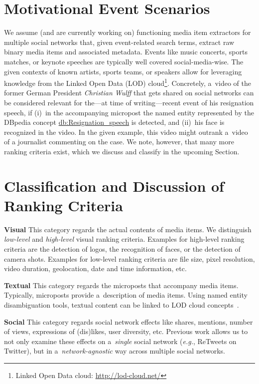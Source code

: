 \documentclass[runningheads,a4paper,11pt]{llncs}
\begin{document}
\section{Motivational Event Scenarios}
We assume (and are currently working on) functioning media item extractors
for multiple social networks that, given event-related search terms,
extract raw binary media items and associated metadata.
Events like music concerts, sports matches, or keynote speeches
are typically well covered social-media-wise.
The given contexts of known artists, sports teams, or speakers
allow for leveraging knowledge from the
Linked Open Data (LOD) cloud\footnote{Linked Open Data cloud: \url{http://lod-cloud.net/}}.
Concretely, a~video of the former German President \emph{Christian Wulff}
that gets shared on social networks
can be considered relevant for the---at time of writing---recent
event of his resignation speech,
if (i)~in the accompanying micropost the named entity represented by the DBpedia concept
\url{db:Resignation_speech} is detected,
and (ii)~his face is recognized in the video.
In the given example, this video might outrank a~video
of a journalist commenting on the case.
We note, however, that many more ranking criteria exist,
which we discuss and classify in the upcoming Section.

\section{Classification and Discussion of Ranking Criteria}
\textbf{Visual}
This category regards the actual contents of media items.
We distinguish \emph{low-level} and \emph{high-level} visual ranking criteria.
Examples for high-level ranking criteria are the detection of logos,
the recognition of faces, or the detection of camera shots.
Examples for low-level ranking criteria are file size, pixel resolution,
video duration, geolocation, date and time information, etc.

\noindent \textbf{Textual}
This category regards the microposts that accompany media items.
Typically, microposts provide a~description of media items.
Using named entity disambiguation tools,
textual content can be linked to LOD cloud concepts~\cite{Facebook2011}.

\noindent \textbf{Social}
This category regards social network effects like shares, mentions,
number of views, expressions of (dis)likes, user diversity, etc.
Previous work allows us to not only examine these effects
on a~\emph{single} social network (\emph{e.g.}, ReTweets on Twitter),
but in a~\emph{network-agnostic} way across multiple social networks.
\end{document}
